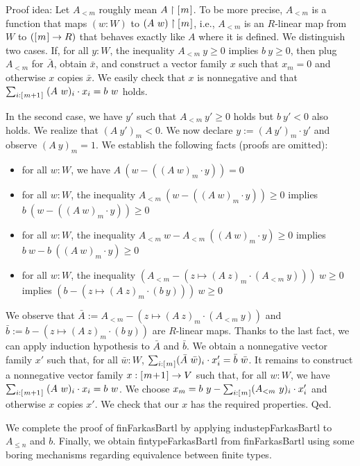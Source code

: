 \documentclass[]{article}
\renewcommand{\.}{\hskip .75pt}
\newcommand{\fin}[1]{[\.#1\.]}
\let\r=\rightarrow
\begin{document}
\medskip \noindent
Proof idea:
Let $A_{<m}$ roughly mean $A \restriction \fin{m}$.
To be more precise, $A_{<m}$ is a function that maps $(w : W)$ to
$(A~w) \restriction \fin{m}$, i.e., $A_{<m}$ is an $R$-linear map
from $W$ to $(\fin{m} \r R)$ that behaves exactly like $A$ where
it is defined.
We distinguish two cases. If, for all $y : W$, the inequality
$A_{<m}~y \ge 0$ implies $b~y \ge 0$, then plug $A_{<m}$
for $\bar{A}$, obtain $\bar{x}$, and construct a vector family $x$ such that
$x_m = 0$ and otherwise $x$ copies $\bar{x}$. We easily check that
$x$ is nonnegative and that
$ \sum_{i : \fin{m+1}}\; (A~w)_i \cdot x_i = b~w $ holds.

In the second case, we have $y'$ such that $A_{<m}~y' \ge 0$
holds but $b~y' < 0$ also holds. We realize that $(A~y')_m < 0$.
We now declare $y := (A~y')_m \cdot y'$ and observe
$(A~y)_m = 1$. We establish the following facts (proofs are omitted):
\begin{itemize}
\item for all $w : W$, we have $A~(w - ((A~w)_m \cdot y)) = 0$
\item for all $w : W$, the inequality $A_{<m}~(w - ((A~w)_m \cdot y)) \ge 0$
implies $b~(w - ((A~w)_m \cdot y)) \ge 0$
\item for all $w : W$, the inequality $A_{<m}~w - A_{<m}~((A~w)_m \cdot y) \ge 0$
implies $b~w - b~((A~w)_m \cdot y) \ge 0$
\item for all $w : W$, the inequality $(A_{<m} - (z \mapsto (A~z)_m \cdot (A_{<m}~y)))~w \ge 0$
implies $(b - (z \mapsto (A~z)_m \cdot (b~y)))~w \ge 0$
\end{itemize}
We observe that
$\bar{A} := A_{<m} - (z \mapsto (A~z)_m \cdot (A_{<m}~y))$
and
$\bar{b} := b - (z \mapsto (A~z)_m \cdot (b~y))$
are $R$-linear maps.
Thanks to the last fact, we can apply induction hypothesis to $\bar{A}$ and $\bar{b}$.
We obtain a nonnegative vector family $x'$ such that,
for all $\bar{w} : W$, $ \sum_{i : \fin{m}} (\bar{A}~\bar{w})_i \cdot x'_i = \bar{b}~\bar{w} $.
It remains to construct a nonnegative vector family $x : \fin{m\!+\!1} \r V$
such that, for all $w : W$, we have
$ \sum_{i : \fin{m+1}}\; (A~w)_i \cdot x_i = b~w $.
We choose $x_m = b~y - \sum_{i : \fin{m}} (A_{<m}~y)_i \cdot x'_i$
and otherwise $x$ copies $x'$. We check that our $x$ has the required
properties. Qed.

\medskip
We complete the proof of finFarkasBartl by applying industepFarkasBartl
to $A_{\le n}$ and $b$. Finally, we obtain fintypeFarkasBartl from
finFarkasBartl using some boring mechanisms regarding equivalence between
finite types.
\end{document}
